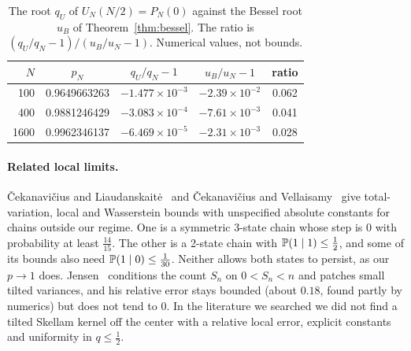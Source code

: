 \begin{table}[ht]
\centering\small
\begin{tabular}{@{}rcccc@{}}
\toprule
$N$ & $p_N$ & $q_U/q_N-1$ & $u_B/u_N-1$ & ratio\\
\midrule
100 & 0.9649663263 & $-1.477\times10^{-3}$ & $-2.39\times10^{-2}$ & 0.062\\
400 & 0.9881246429 & $-3.083\times10^{-4}$ & $-7.61\times10^{-3}$ & 0.041\\
1600 & 0.9962346137 & $-6.469\times10^{-5}$ & $-2.31\times10^{-3}$ & 0.028\\
\bottomrule
\end{tabular}
\caption{The root $q_U$ of $U_N(N/2)=P_N(0)$ against the Bessel root $u_B$ of
Theorem~\ref{thm:bessel}. The ratio is $(q_U/q_N-1)/(u_B/u_N-1)$. Numerical values, not bounds.}
\label{tab:llt-center}
\end{table}

\paragraph{Related local limits.} \v{C}ekanavi\v{c}ius and
Liaudanskait\.{e}~\cite{cekanavicius2024} and \v{C}ekanavi\v{c}ius and
Vellaisamy~\cite{cekanavicius2010} give total-variation, local and Wasserstein
bounds with unspecified absolute constants for chains outside our regime. One
is a symmetric 3-state chain whose step is $0$ with probability at least
$\frac{14}{15}$. The other is a 2-state chain with $\mathbb{P}(1\mid1)\le\frac12$,
and some of its bounds also need $\mathbb{P}(1\mid0)\le\frac1{30}$. Neither allows
both states to persist, as our $p\to1$ does. Jensen~\cite{jensen2013}
conditions the count $S_n$ on $0<S_n<n$ and patches small tilted variances,
and his relative error stays bounded (about $0.18$, found partly by numerics)
but does not tend to $0$. In the literature we searched we did not find a
tilted Skellam kernel off the center with a relative local error, explicit
constants and uniformity in $q\le\frac12$.
